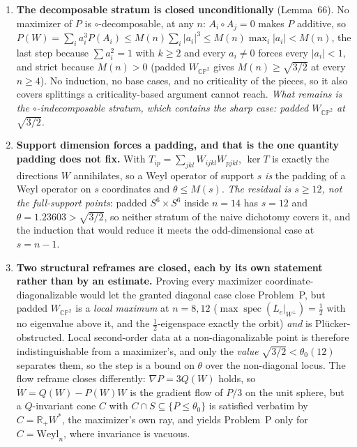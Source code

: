 \begin{enumerate}[leftmargin=1.8em]
\item \textbf{The decomposable stratum is closed unconditionally} (Lemma~66). No maximizer of $P$ is $\circ$-decomposable, at any $n$: $A_i\circ A_j=0$ makes $P$ additive, so $P(W)=\sum_ia_i^3P(A_i)\le M(n)\sum_i\lvert a_i\rvert^3\le M(n)\max_i\lvert a_i\rvert<M(n)$, the last step because $\sum a_i^2=1$ with $k\ge2$ and every $a_i\ne0$ forces every $\lvert a_i\rvert<1$, and strict because $M(n)>0$ (padded $W_{\mathbb{CP}^2}$ gives $M(n)\ge\sqrt{3/2}$ at every $n\ge4$). No induction, no base cases, and no criticality of the pieces, so it also covers splittings a criticality-based argument cannot reach. \emph{What remains is the $\circ$-indecomposable stratum, which contains the sharp case: padded $W_{\mathbb{CP}^2}$ at $\sqrt{3/2}$.}

\item \textbf{Support dimension forces a padding, and that is the one quantity padding does not fix.} With $T_{ip}=\sum_{jkl}W_{ijkl}W_{pjkl}$, $\ker T$ is exactly the directions $W$ annihilates, so a Weyl operator of support $s$ \emph{is} the padding of a Weyl operator on $s$ coordinates and $\theta\le M(s)$. \emph{The residual is $s\ge12$, not the full-support points}: padded $S^6\times S^6$ inside $n=14$ has $s=12$ and $\theta=1.23603>\sqrt{3/2}$, so neither stratum of the naive dichotomy covers it, and the induction that would reduce it meets the odd-dimensional case at $s=n-1$.

\item \textbf{Two structural reframes are closed, each by its own statement rather than by an estimate.} Proving every maximizer coordinate-diagonalizable would let the granted diagonal case close Problem~P, but padded $W_{\mathbb{CP}^2}$ is a \emph{local maximum} at $n=8,12$ ($\max\operatorname{spec}(L_e|_{W^\perp})=\tfrac12$ with no eigenvalue above it, and the $\tfrac12$-eigenspace exactly the orbit) \emph{and} is Pl\"ucker-obstructed. Local second-order data at a non-diagonalizable point is therefore indistinguishable from a maximizer's, and only the \emph{value} $\sqrt{3/2}<\theta_0(12)$ separates them, so the step is a bound on $\theta$ over the non-diagonal locus. The flow reframe closes differently: $\nabla P=3Q(W)$ holds, so $\dot W=Q(W)-P(W)W$ is the gradient flow of $P/3$ on the unit sphere, but a $Q$-invariant cone $C$ with $C\cap S\subseteq\{P\le\theta_0\}$ is satisfied verbatim by $C=\mathbb R_+W^\ast$, the maximizer's own ray, and yields Problem~P only for $C=\mathrm{Weyl}_n$, where invariance is vacuous.


\end{enumerate}
